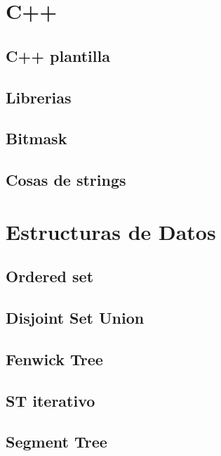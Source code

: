 \section{C++}
\subsection{C++ plantilla}
\raggedbottom
\hrulefill
\subsection{Librerias}
\raggedbottom
\hrulefill
\subsection{Bitmask}
\raggedbottom
\hrulefill
\subsection{Cosas de strings}
\raggedbottom
\hrulefill

\section{Estructuras de Datos}
\subsection{Ordered set}
\raggedbottom
\hrulefill
\subsection{Disjoint Set Union}
\raggedbottom
\hrulefill
\subsection{Fenwick Tree}
\raggedbottom
\hrulefill
\subsection{ST iterativo}
\raggedbottom
\hrulefill
\subsection{Segment Tree}
\raggedbottom
\hrulefill
